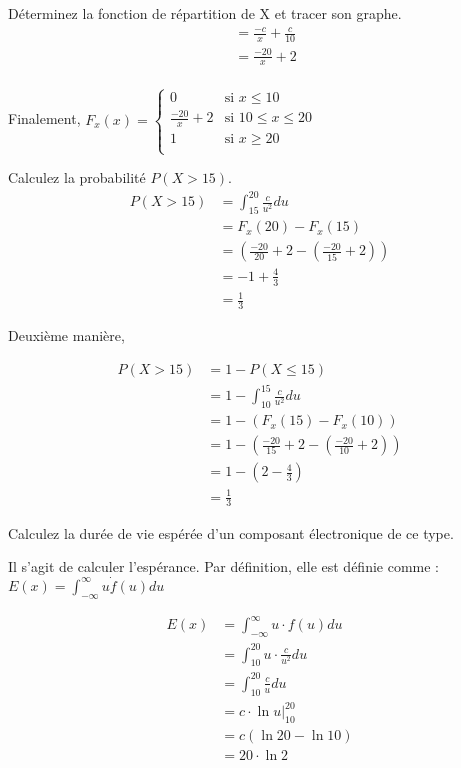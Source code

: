 \begin{exo}
\begin{subexo}{Déterminez la fonction de répartition de X et tracer son graphe.}
\begin{align*}
			&= \frac{-c}{x} + \frac{c}{10} \\
			&= \frac{-20}{x} + 2 \\
		\end{align*}
		\begin{center}
			Finalement,   	$ F_x(x) =\begin{cases}
				0 & \text{si $x \le 10$} \\
				\frac{-20}{x} + 2 & \text{si $10 \leq x \leq 20$} \\
				1 & \text{si $x \geq 20$} \\
			\end{cases}$
		\end{center}
	\end{subexo}
	\begin{subexo}{Calculez la probabilité $P(X > 15)$.}
		\begin{align*}
			P(X > 15) &= \displaystyle\int_{15}^{20}{\frac{c}{u^2}}du \\
			&= F_x(20) - F_x(15) \\
			&= \left( \frac{-20}{20} + 2 - \left(\frac{-20}{15} + 2\right)\right) \\
			&= -1 + \frac{4}{3} \\ 
			&= \frac{1}{3}
		\end{align*}
		\begin{flushleft}
			Deuxième manière,
		\end{flushleft}
		\begin{align*}
			P(X > 15) &= 1 - P(X \leq 15) \\
			&= 1 - \displaystyle\int_{10}^{15}{\frac{c}{u^2}}du \\
			&= 1 - (F_x(15) - F_x(10)) \\
			&= 1 - \left( \frac{-20}{15} + 2 - \left(\frac{-20}{10} + 2\right)\right) \\
			&= 1 - \left(2 -\frac{4}{3}\right) \\
			&= \frac{1}{3}
		\end{align*}
	\end{subexo}
	\begin{subexo}{Calculez la durée de vie espérée d'un composant électronique de ce type.}
		\begin{center}
			Il s'agit de calculer l'espérance. Par définition, elle est définie comme : $E(x) = \displaystyle\int_{-\infty}^{\infty}{u\dot f(u)}du$
		\end{center}
		\begin{align*}
			E(x) &= \displaystyle\int_{-\infty}^{\infty}{u\cdot f(u)}du \\
			&= \displaystyle\int_{10}^{20}{u \cdot \frac{c}{u^2}}du \\ 
			&= \displaystyle\int_{10}^{20}{\frac{c}{u}}du \\ 
			&= c\cdot \ln{u}\bigg\vert_{10}^{20} \\
			&= c (\ln{20} - \ln{10}) \\
			&= 20 \cdot \ln{2}
		\end{align*}
	\end{subexo}
\end{exo}
